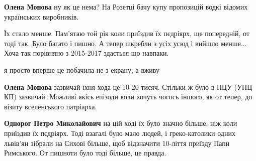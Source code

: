 \begin{itemize}
\begin{itemize}
\textbf{Олена Монова} ну як це нема? На Розетці бачу купу пропозицій водкі відомих українських виробників.
\end{itemize}

 

Їх стало менше. Пам'ятаю той рік коли приїздив їх пєдріярх, ще попередній, от тоді так. Було багато і пишно.
А тепер шкребли з усіх усюд і вийшло менше...
Хоча так порівняно з 2015-2017 здається що навпаки.

\begin{itemize}
 
я просто вперше це побачила не з екрану, а вживу

 
\textbf{Олена Монова} зазвичай їхня хода це 10-20 тисяч. Стільки ж було в ПЦУ (УПЦ КП) зазвичай.
Можливі якісь епізоди коли хочуть чогось іншого, як от тепер, до візиту вселенського патріарха.

 
\textbf{Однорог Петро Миколайович} на цій ході їх було значно більше, ніж коли приїздив їх пєдріярх. Тоді взагалі було мало людей, і греко-католики одних львів'ян зібрали на Сихові більше, щоб відзначити 10-ліття приїзду Папи Римського. От пишноти було тоді більше, це правда.

 

\end{itemize}
\end{itemize}
